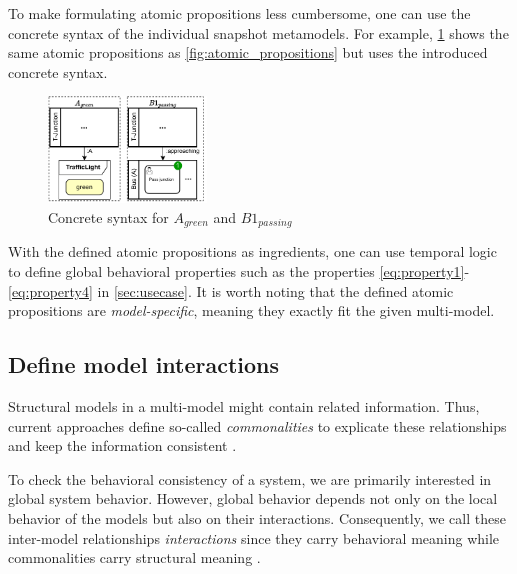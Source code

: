 \documentclass{jot}
\begin{document}
To make formulating atomic propositions less cumbersome, one can use the concrete syntax of the individual snapshot metamodels.
For example, \cref{fig:atomic_propositions_concrete} shows the same atomic propositions as \cref{fig:atomic_propositions} but uses the introduced concrete syntax.

\begin{figure}[h]
    \centering
    \includegraphics[width=0.375\textwidth]{figures/atomic_props_concrete.pdf}
    \caption{Concrete syntax for $A_{green}$ and $B1_{passing}$}
    \label{fig:atomic_propositions_concrete}
\end{figure}

With the defined atomic propositions as ingredients, one can use temporal logic to define global behavioral properties such as the properties \eqref{eq:property1}-\eqref{eq:property4} in \autoref{sec:usecase}.
It is worth noting that the defined atomic propositions are \emph{model-specific}, meaning they exactly fit the given multi-model.


\subsection{Define model interactions}
Structural models in a multi-model might contain related information.
Thus, current approaches define so-called \emph{commonalities} to explicate these relationships and keep the information consistent \cite{stunkelComprehensiveSystemsFormal2021,klareCommonalitiesPreservingConsistency2019}.

To check the behavioral consistency of a system, we are primarily interested in global system behavior.
However, global behavior depends not only on the local behavior of the models but also on their interactions.
Consequently, we call these inter-model relationships \emph{interactions} since they carry behavioral meaning while commonalities carry structural meaning \cite{krauterBehavioralConsistencyHeterogeneous2021}.
\end{document}
